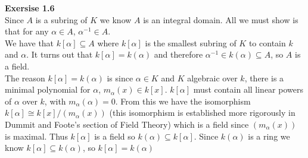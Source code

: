 \documentclass[12pt]{article}
\newenvironment{ques}[1]{\textbf{Exersise #1}\vspace{1 mm}\\ }{\bigskip}
\theoremstyle{definition}
\renewcommand{\a}{\alpha}
\begin{document}
\begin{ques}{1.6}
	Since $A$ is a subring of $K$ we know $A$ is an integral domain. All we
	must show is that for any $\a \in A$, $\a^{-1} \in A$.\\
	We have that $k[\a] \subseteq A$ where $k[\a]$ is the smallest subring of
	$K$ to contain $k$ and $\a$. It turns out that $k[\a] = k(\a)$ and
	therefore $\a^{-1} \in k(\a) \subseteq A$, so $A$ is a field.\\
	The reason $k[\a] = k(\a)$ is since $\a \in K$ and $K$ algebraic over $k$,
	there is a minimal polynomial for $\a$, $m_\a(x) \in k[x]$. $k[\a]$ must
	contain all linear powers of $\a$ over $k$, with $m_\a(\a) = 0$. From this we
	have the isomorphism $k[\a] \cong k[x]/(m_\a(x))$ (this isomorphism is
	established more rigorously in Dummit and Foote's section of Field Theory)
	which is a field since $(m_\a(x))$ is maximal. Thus $k[\a]$ is a field so
	$k(\a) \subseteq k[\a]$.  Since $k(\a)$ is a ring we know $k[\a] \subseteq
	k(\a)$, so $k[\a] = k(\a)$
\end{ques}
\end{document}
